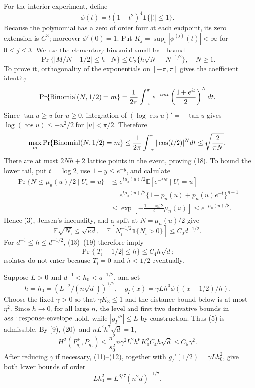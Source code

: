 For the interior experiment, define
\[
 \phi(t)=t(1-t^2)^4\mathbf1\{|t|\leq1\}.
\tag{17}
\]
Because the polynomial has a zero of order four at each endpoint, its zero extension is \(C^3\); moreover \(\phi'(0)=1\).  Put \(K_j=\sup_t|\phi^{(j)}(t)|<\infty\) for \(0\leq j\leq3\).  We use the elementary binomial small-ball bound
\[
 \Pr\{|M/N-1/2|\leq h\mid N\}
 \leq C_2\{h\sqrt N+N^{-1/2}\},\quad N\geq1.
\tag{18}
\]
To prove it, orthogonality of the exponentials on \([-\pi,\pi]\) gives the coefficient identity
\[
 \Pr\{{\rm Binomial}(N,1/2)=m\}
 =\frac1{2\pi}\int_{-\pi}^{\pi}
 e^{-imt}\left(\frac{1+e^{it}}2\right)^Ndt.
\]
Since \(\tan u\geq u\) for \(u\geq0\), integration of \((\log\cos u)'=-\tan u\) gives \(\log(\cos u)\leq-u^2/2\) for \(|u|<\pi/2\).  Therefore
\[
 \max_m\Pr\{{\rm Binomial}(N,1/2)=m\}
 \leq\frac1{2\pi}\int_{-\pi}^{\pi}|\cos(t/2)|^Ndt
 \leq\sqrt{\frac2{\pi N}}.
\]
There are at most \(2Nh+2\) lattice points in the event, proving (18).  To bound the lower tail, put \(t=\log2\), use \(1-y\leq e^{-y}\), and calculate
\[
\begin{aligned}
 \Pr\{N\leq\mu_n(u)/2\mid U_i=u\}
 &\leq e^{t\mu_n(u)/2}\mathbb E[e^{-tN}\mid U_i=u]\\
 &=e^{t\mu_n(u)/2}\{1-p_n(u)+p_n(u)e^{-t}\}^{n-1}\\
 &\leq\exp\!\left[-\frac{1-\log2}{2}\mu_n(u)\right]
 \leq e^{-\mu_n(u)/8}.
\end{aligned}
\]
Hence (3), Jensen's inequality, and a split at \(N=\mu_n(u)/2\) give
\[
 \mathbb E\sqrt{N_i}\leq\sqrt{\kappa d},
 \quad
 \mathbb E[N_i^{-1/2}\mathbf1\{N_i>0\}]\leq C_3d^{-1/2}.
\tag{19}
\]
For \(d^{-1}\leq h\leq d^{-1/2}\), (18)--(19) therefore imply
\[
 \Pr\{|T_i-1/2|\leq h\}\leq C_4h\sqrt d;
\tag{20}
\]
isolates do not enter because \(T_i=0\) and \(h<1/2\) eventually.

Suppose \(L>0\) and \(d^{-1}<h_0<d^{-1/2}\), and set
\[
 h=h_0=(L^{-2}/(n\sqrt d))^{1/7},
 \quad g_I(x)=\gamma Lh^3\phi((x-1/2)/h).
\tag{21}
\]
Choose the fixed \(\gamma>0\) so that \(\gamma K_3\leq1\) and the distance bound below is at most \(\eta^2\).  Since \(h\to0\), for all large \(n\), the level and first two derivative bounds in \({\rm ass:response\text{-}envelope}\) hold, while \(|g_I'''|\leq L\) by construction.  Thus (5) is admissible.  By (9), (20), and \(nL^2h^7\sqrt d=1\),
\[
 H^2(P_{g_I}^+,P_{g_I}^-)
 \leq\frac{\pi^2}{s_0^2}n\gamma^2L^2h^6K_0^2C_4h\sqrt d
 \leq C_5\gamma^2.
\tag{22}
\]
After reducing \(\gamma\) if necessary, (11)--(12), together with \(g_I'(1/2)=\gamma Lh_0^2\), give both lower bounds of order
\[
 Lh_0^2=L^{3/7}(n^2d)^{-1/7}.
\tag{23}
\]

